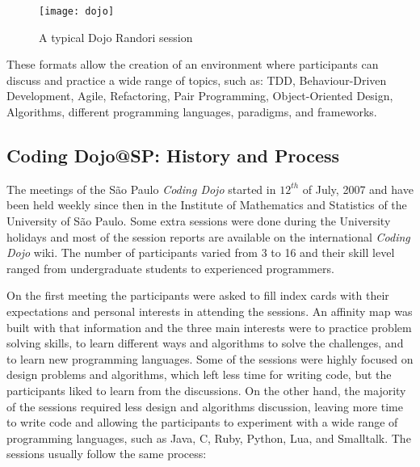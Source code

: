 \begin{figure}[htp]
\centering
\texttt{[image: dojo]}
\caption{A typical Dojo Randori session}\label{fig:dojo}
\end{figure}

These formats allow the creation of an environment where participants
can discuss and practice a wide range of topics, such as: TDD,
Behaviour-Driven Development, Agile, Refactoring, Pair Programming,
Object-Oriented Design, Algorithms, different programming languages,
paradigms, and frameworks.

\subsection{Coding Dojo@SP: History and Process}\label{subsec:dojosp}

The meetings of the São Paulo \emph{Coding Dojo} started in $12^{th}$
of July, 2007 and have been held weekly since then in the Institute of
Mathematics and Statistics of the University of São Paulo. Some extra
sessions were done during the University holidays and most of the
session reports are available on the international \emph{Coding Dojo}
wiki\cite{DojoWiki}. The number of participants varied from 3 to 16
and their skill level ranged from undergraduate students to
experienced programmers.

On the first meeting the participants were asked to fill index cards
with their expectations and personal interests in attending the
sessions. An affinity map was built with that information and the
three main interests were to practice problem solving skills, to learn
different ways and algorithms to solve the challenges, and to learn
new programming languages. Some of the sessions were highly focused on
design problems and algorithms, which left less time for writing code,
but the participants liked to learn from the discussions. On the other
hand, the majority of the sessions required less design and algorithms
discussion, leaving more time to write code and allowing the
participants to experiment with a wide range of programming languages,
such as Java, C, Ruby, Python, Lua, and Smalltalk. The sessions usually
follow the same process:

